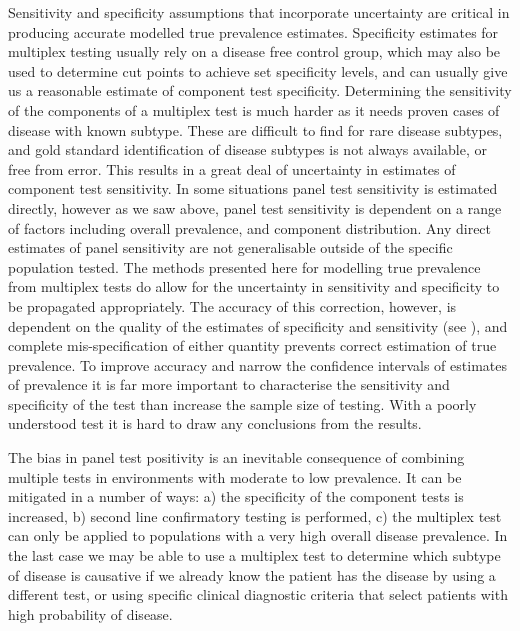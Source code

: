 \documentclass[10pt,letterpaper]{article}
\begin{document}
Sensitivity and specificity assumptions that incorporate uncertainty are critical in producing accurate modelled true prevalence estimates. Specificity estimates for multiplex testing usually rely on a disease free control group, which may also be used to determine cut points to achieve set specificity levels, and can usually give us a reasonable estimate of component test specificity. Determining the sensitivity of the components of a multiplex test is much harder as it needs proven cases of disease with known subtype. These are difficult to find for rare disease subtypes, and gold standard identification of disease subtypes is not always available, or free from error\cite{loeffelholz2020,leber2018}. This results in a great deal of uncertainty in estimates of component test sensitivity. In some situations panel test sensitivity is estimated directly, however as we saw above, panel test sensitivity is dependent on a range of factors including overall prevalence, and component distribution. Any direct estimates of panel sensitivity are not generalisable outside of the specific population tested. The methods presented here for modelling true prevalence from multiplex tests do allow for the uncertainty in sensitivity and specificity to be propagated appropriately. The accuracy of this correction, however, is dependent on the quality of the estimates of specificity and sensitivity (see ), and complete mis-specification of either quantity prevents correct estimation of true prevalence. To improve accuracy and narrow the confidence intervals of estimates of prevalence it is far more important to characterise the sensitivity and specificity of the test than increase the sample size of testing. With a poorly understood test it is hard to draw any conclusions from the results.

The bias in panel test positivity is an inevitable consequence of combining multiple tests in environments with moderate to low prevalence. It can be mitigated in a number of ways: a) the specificity of the component tests is increased, b) second line confirmatory testing is performed, c) the multiplex test can only be applied to populations with a very high overall disease prevalence. In the last case we may be able to use a multiplex test to determine which subtype of disease is causative if we already know the patient has the disease by using a different test, or using specific clinical diagnostic criteria that select patients with high probability of disease.
\end{document}
